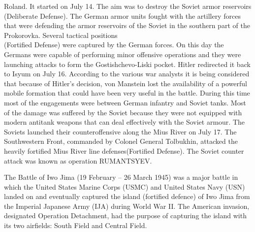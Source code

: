 \documentclass[]{article}
\begin{document}
Roland. It started on July 14. The aim was to destroy the Soviet armor reservoirs\\(\Gls{Deliberate Defense}). The German armor units fought with the artillery forces that were defending the armor reservoirs of the Soviet in the southern part of the Prokorovka. Several tactical positions\\ (\Gls{Fortified Defense}) were captured by the German forces. On this day the Germans were capable of performing minor offensive operations and they were launching attacks to form the Gostishchevo-Liski pocket. Hitler redirected it back to Isyum on July 16. According to the various war analysts it is being considered that because of Hitler's decision, von Manstein lost the availability of a powerful mobile formation that could have been very useful in the battle. During this time most of the engagements were between German infantry and Soviet tanks. Most of the damage was suffered by the Soviet because they were not equipped with modern antitank weapons that can deal effectively with the Soviet armour. The Soviets launched their counteroffensive along the Mius River on July 17. The Southwestern Front, commanded by Colonel General Tolbukhin, attacked the heavily fortified Mius River line defenses(\Gls{Fortified Defense}). The Soviet counter attack was known as operation RUMANTSYEV.

The Battle of Iwo Jima (19 February – 26 March 1945) was a major battle in which the United States Marine Corps (USMC) and United States Navy (USN) landed on and eventually captured the island (fortified defence) of Iwo Jima from the Imperial Japanese Army (IJA) during World War II. The American invasion, designated Operation Detachment, had the purpose of capturing the island with its two airfields: South Field and Central Field\cite{BattleOfIJ}.


\clearpage
\newpage
\end{document}
